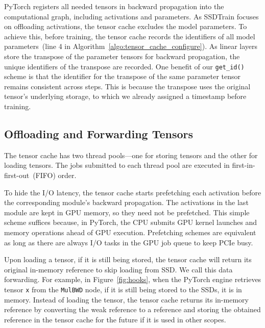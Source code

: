 PyTorch registers all needed tensors in backward propagation into the computational graph, including activations and parameters. As SSDTrain focuses on offloading activations, the tensor cache excludes the model parameters. To achieve this, before training, the tensor cache records the identifiers of all model parameters~(line 4 in Algorithm~\ref{algo:tensor_cache_configure}). As linear layers store the transpose of the parameter tensors for backward propagation, the unique identifiers of the transpose are recorded. One benefit of our \texttt{get\_id()} scheme is that the identifier for the transpose of the same parameter tensor remains consistent across steps. This is because the transpose uses the original tensor's underlying storage, to which we already assigned a timestamp before training.


\subsection{Offloading and Forwarding Tensors}
\label{sec:prefetch}

The tensor cache has two thread pools---one for storing tensors and the other for loading tensors. The jobs submitted to each thread pool are executed in first-in-first-out~(FIFO) order.

To hide the I/O latency, the tensor cache starts prefetching each activation before the corresponding module's backward propagation. 
The activations in the last module are kept in GPU memory, so they need not be prefetched.
This simple scheme suffices because, in PyTorch, the CPU submits GPU kernel launches and memory operations ahead of GPU execution. Prefetching schemes are equivalent as long as there are always I/O tasks in the GPU job queue to keep PCIe busy.



Upon loading a tensor, if it is still being stored, the tensor cache will return its original in-memory reference to skip loading from SSD. We call this data forwarding. For example, in Figure~\ref{fig:hooks}, when the PyTorch engine retrieves tensor \texttt{x} from the \texttt{MulBWD} node, if it is still being stored to the SSDs, it is in memory. Instead of loading the tensor, the tensor cache returns its in-memory reference by converting the weak reference to a reference and storing the obtained reference in the tensor cache for the future if it is used in other scopes.



